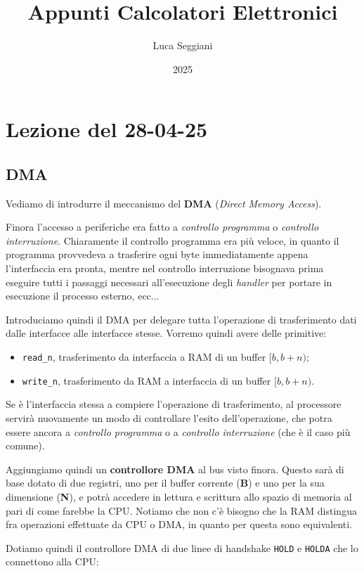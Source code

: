 \documentclass[a4paper,11pt]{article}
\title{Appunti Calcolatori Elettronici}
\author{Luca Seggiani}
\date{2025}
\begin{document}
\section{Lezione del 28-04-25}

\thispagestyle{empty}
\pagestyle{fancy}

\subsection{DMA}
Vediamo di introdurre il meccanismo del \textbf{DMA} (\textit{Direct Memory Access}).

Finora l'accesso a periferiche era fatto a \textit{controllo programma} o \textit{controllo interruzione}.
Chiaramente il controllo programma era più veloce, in quanto il programma provvedeva a trasferire ogni byte immediatamente appena l'interfaccia era pronta, mentre nel controllo interruzione bisognava prima eseguire tutti i passaggi necessari all'esecuzione degli \textit{handler} per portare in esecuzione il processo esterno, ecc... 

Introduciamo quindi il DMA per delegare tutta l'operazione di trasferimento dati dalle interfacce alle interfacce stesse.
Vorremo quindi avere delle primitive:
\begin{itemize}
	\item \lstinline|read_n|, trasferimento da interfaccia a RAM di un buffer $[b, b + n)$;
	\item \lstinline|write_n|, trasferimento da RAM a interfaccia di un buffer $[b, b+n)$.
\end{itemize}

Se è l'interfaccia stessa a compiere l'operazione di trasferimento, al processore servirà nuovamente un modo di controllare l'esito dell'operazione, che potra essere ancora a \textit{controllo programma} o a \textit{controllo interruzione} (che è il caso più comune).

Aggiungiamo quindi un \textbf{controllore DMA} al bus visto finora.
Questo sarà di base dotato di due registri, uno per il buffer corrente (\textbf{B}) e uno per la sua dimensione (\textbf{N}), e potrà accedere in lettura e scrittura allo spazio di memoria al pari di come farebbe la CPU.
Notiamo che non c'è bisogno che la RAM distingua fra operazioni effettuate da CPU o DMA, in quanto per questa sono equivalenti.

Dotiamo quindi il controllore DMA di due linee di handshake \lstinline|HOLD| e \lstinline|HOLDA| che lo connettono alla CPU:
\end{document}
